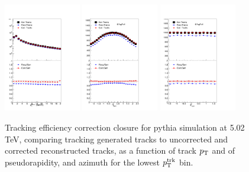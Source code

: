  \begin{figure}[h!]
    \begin{center}
       \includegraphics[width=0.299\textwidth]{figures/Detector/TrackingEfficiencyPtPythia.pdf}
             \includegraphics[width=0.299\textwidth]{figures/Detector/TrackingEfficiencyEtaPythia_TrkPt0p7TrkPt1.pdf}	
                    \includegraphics[width=0.299\textwidth]{figures/Detector/TrackingEfficiencyPhiPythia_TrkPt0p7TrkPt1.pdf}	
         \caption[Tracking efficiency correction example]{Tracking efficiency correction closure for {\sc pythia} simulation at 5.02 TeV, comparing tracking generated tracks to uncorrected and corrected reconstructed tracks, as a function of track $p_{\rm T}$ and of pseudorapidity, and azimuth for the lowest $p_{\rm T}^{\rm trk}$ bin.}
       \label{fig:trk_eff_pythia}
    \end{center}
 \end{figure}
 
 



